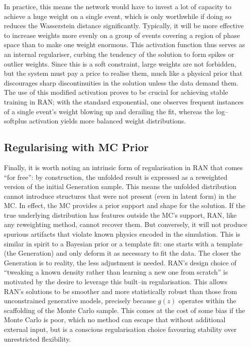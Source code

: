 {{            In practice, this means the network would have to invest a lot of capacity to achieve a huge weight on a single event, which is only worthwhile if doing so reduces the Wasserstein distance significantly.
            Typically, it will be more effective to increase weights more evenly on a group of events covering a region of phase space than to make one weight enormous.
            This activation function thus serves as an internal regulariser, curbing the tendency of the solution to form spikes or outlier weights.
           Since this is a soft constraint, large weights are not forbidden, but the system must pay a price to realise them, much like a physical prior that discourages sharp discontinuities in the solution unless the data demand them.
            The use of this modified activation proves to be crucial for achieving stable training in RAN; with the standard exponential, one observes frequent instances of a single event’s weight blowing up and derailing the fit, whereas the log--softplus activation yields more balanced weight distributions.
        \subsection{Regularising with MC Prior}
            Finally, it is worth noting an intrinsic form of regularisation in RAN that comes ``for free'': by construction, the unfolded result is expressed as a reweighted version of the initial Generation sample.
            This means the unfolded distribution cannot introduce structures that were not present (even in latent form) in the MC.
            In effect, the MC provides a prior support and shape for the solution.
            If the true underlying distribution has features outside the MC’s support, RAN, like any reweighting method, cannot recover them.
            But conversely, it will not produce spurious artifacts that violate known physics encoded in the simulation.
            This is similar in spirit to a Bayesian prior or a template fit: one starts with a template (the Generation) and only deform it as necessary to fit the data.
            The closer the Generation is to reality, the less adjustment is needed.
            RAN’s design choice of ``tweaking a known density rather than learning a new one from scratch'' is motivated by the desire to leverage this built--in regularisation.
            This allows RAN’s solutions to be smoother and more statistically robust than those from unconstrained generative models, precisely because $g(z)$ operates within the scaffolding of the Monte Carlo sample.
            This comes at the cost of some bias if the Monte Carlo is poor, which no method can escape that without additional external input, but is a conscious regularisation choice favouring stability over unrestricted flexibility.

}}
